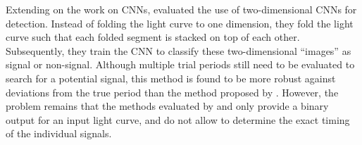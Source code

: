 Extending on the work on CNNs, \cite{chintarungruangchai2019detecting} evaluated the use of two-dimensional CNNs for detection. Instead of folding the light curve to one dimension, they fold the light curve such that each folded segment is stacked on top of each other. Subsequently, they train the CNN to classify these two-dimensional ``images'' as signal or non-signal. Although multiple trial periods still need to be evaluated to search for a potential signal, this method is found to be more robust against deviations from the true period than the method proposed by \cite{pearson2018searching}. However, the problem remains that the methods evaluated by \cite{chintarungruangchai2019detecting} and \cite{zucker2018shallow} only provide a binary output for an input light curve, and do not allow to determine the exact timing of the individual signals.